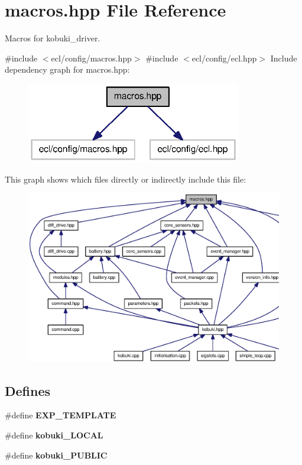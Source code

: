 \section{macros.\-hpp \-File \-Reference}
\label{macros_8hpp}


\-Macros for kobuki\-\_\-driver.  


{\ttfamily \#include $<$ecl/config/macros.\-hpp$>$}\*
{\ttfamily \#include $<$ecl/config/ecl.\-hpp$>$}\*
\-Include dependency graph for macros.\-hpp\-:
\nopagebreak
\begin{figure}[H]
\begin{center}
\leavevmode
\includegraphics[width=266pt]{macros_8hpp__incl}
\end{center}
\end{figure}
\-This graph shows which files directly or indirectly include this file\-:
\nopagebreak
\begin{figure}[H]
\begin{center}
\leavevmode
\includegraphics[width=350pt]{macros_8hpp__dep__incl}
\end{center}
\end{figure}
\subsection*{\-Defines}
\begin{DoxyCompactItemize}
\item 
\#define {\bf \-E\-X\-P\-\_\-\-T\-E\-M\-P\-L\-A\-T\-E}
\item 
\#define {\bf kobuki\-\_\-\-L\-O\-C\-A\-L}
\item 
\#define {\bf kobuki\-\_\-\-P\-U\-B\-L\-I\-C}
\end{DoxyCompactItemize}


